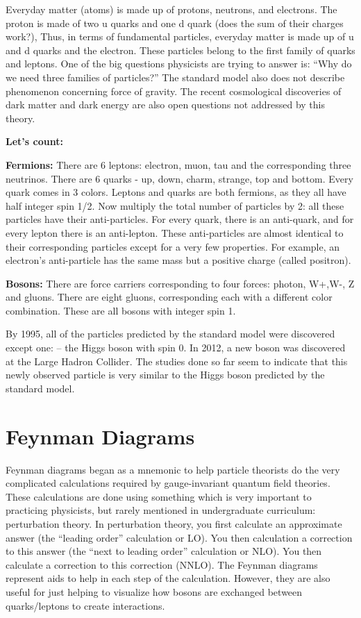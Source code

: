 Everyday matter (atoms) is made up of protons, neutrons, and electrons. The proton is made of two u quarks and one d quark (does the sum of their charges work?), Thus, in terms of fundamental particles,  everyday matter is made up of u and d quarks and the electron.  These particles belong to the first family of quarks and leptons. One of the big questions physicists are trying to answer is: 
``Why do we need three families of particles?” The standard model also does not describe phenomenon concerning force of gravity. The recent cosmological discoveries of dark matter and dark energy are also open questions not addressed by this theory. 

{\bf Let’s count:} 

{\bf Fermions:} There are 6 leptons: electron, muon, tau and the corresponding three neutrinos.
There are 6 quarks - up, down, charm, strange, top and bottom. Every quark comes in 3 colors.
Leptons and quarks are both fermions, as they all have half integer spin 1/2.
Now multiply the total number of particles by 2: all these particles have their anti-particles. For every quark, there is an anti-quark, and for every lepton there is an anti-lepton. These anti-particles are almost identical to their corresponding particles except for a very few properties.  For example, an electron's anti-particle has the same mass but a positive charge (called positron).

{\bf Bosons:} There are force carriers corresponding to four forces: photon, W+,W-,  Z and gluons.  There are eight gluons, corresponding each with a different color combination.  These are all bosons with integer spin 1.

By 1995, all of the particles predicted by the standard model were discovered except one: – the Higgs boson with spin 0. In 2012, a new boson was discovered at the Large Hadron Collider.  The studies done so far seem to indicate that this newly observed particle is very similar to the Higgs boson predicted by the standard model. 


\section{Feynman Diagrams}

Feynman diagrams began as a mnemonic to help particle theorists do the very complicated calculations required by gauge-invariant quantum field theories.  These calculations are done using something which is very important to practicing physicists, but rarely mentioned in undergraduate curriculum: perturbation theory.  In perturbation theory, you first calculate an approximate answer (the “leading order” calculation or LO).  You then calculation a correction to this answer (the “next to leading order” calculation or NLO).  You then calculate a correction to this correction (NNLO).  The Feynman diagrams represent aids to help in each step of the calculation.  However, they are also useful for just helping to visualize how bosons are exchanged between quarks/leptons to create interactions.

